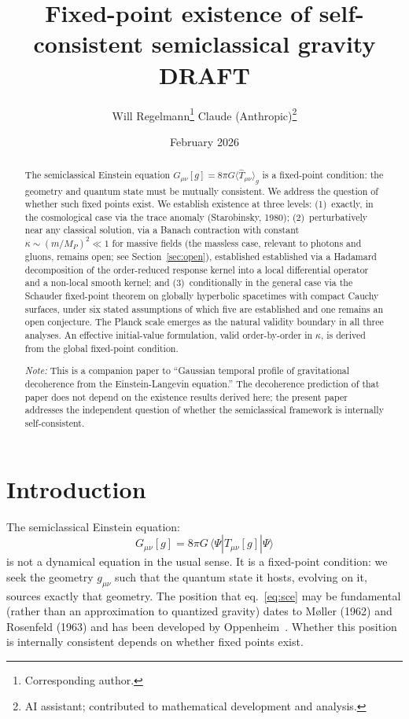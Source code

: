 \documentclass[12pt,a4paper]{article}
\title{\textbf{Fixed-point existence of self-consistent semiclassical gravity}\\[6pt]
{\large DRAFT}}
\author{Will Regelmann\thanks{Corresponding author.} \quad Claude (Anthropic)\thanks{AI
assistant; contributed to mathematical development and analysis.}}
\date{February 2026}
\begin{document}
\maketitle

\begin{abstract}
The semiclassical Einstein equation $G_{\mu\nu}[g] = 8\pi G\langle\hat{T}_{\mu\nu}\rangle_g$
is a fixed-point condition: the geometry and quantum state must be mutually consistent.
We address the question of whether such fixed points exist. We establish existence at three
levels: (1)~exactly, in the cosmological case via the trace anomaly
(Starobinsky, 1980); (2)~perturbatively near any classical solution, via a Banach
contraction with constant $\kappa \sim (m/M_P)^2 \ll 1$ for massive fields (the massless case, relevant to photons and gluons, remains open; see Section~\ref{sec:open}), established
established via a Hadamard decomposition of the order-reduced response kernel into a local
differential operator and a non-local smooth kernel; and (3)~conditionally in the general
case via the Schauder fixed-point theorem on globally hyperbolic spacetimes with compact
Cauchy surfaces, under six stated assumptions of which five are established and one remains
an open conjecture. The Planck scale emerges as the natural validity boundary in all three
analyses. An effective initial-value formulation, valid order-by-order in $\kappa$, is
derived from the global fixed-point condition.

\bigskip\noindent\textit{Note:} This is a companion paper to ``Gaussian temporal profile
of gravitational decoherence from the Einstein-Langevin equation.'' The decoherence
prediction of that paper does not depend on the existence results derived here; the present
paper addresses the independent question of whether the semiclassical framework is
internally self-consistent.
\end{abstract}

\section{Introduction}

The semiclassical Einstein equation:
\begin{equation}
G_{\mu\nu}[g] = 8\pi G\,\langle\Psi|\hat{T}_{\mu\nu}[g]|\Psi\rangle
\label{eq:sce}
\end{equation}
is not a dynamical equation in the usual sense. It is a fixed-point condition: we seek the
geometry $g_{\mu\nu}$ such that the quantum state it hosts, evolving on it, sources exactly
that geometry. The position that eq.~\eqref{eq:sce} may be fundamental (rather than an
approximation to quantized gravity) dates to M\o ller (1962) and Rosenfeld (1963) and has
been developed by Oppenheim~\cite{oppenheim}. Whether this position is internally
consistent depends on whether fixed points exist.
\end{document}
